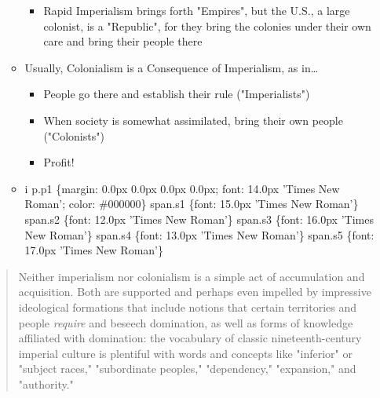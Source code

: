 \documentclass[letterpaper]{article}
\begin{document}
\begin{itemize}
\begin{itemize}
\begin{itemize}
\item Rapid Imperialism brings forth "Empires", but the U.S., a large
colonist, is a "Republic", for they bring the colonies under their
own care and bring their people there
\end{itemize}

\item Usually, Colonialism is a Consequence of Imperialism, as in\ldots{}

\begin{itemize}
\item People go there and establish their rule ("Imperialists")
\item When society is somewhat assimilated, bring their own people
("Colonists")
\item Profit!
\end{itemize}

\item i p.p1 \{margin: 0.0px 0.0px 0.0px 0.0px; font: 14.0px 'Times New
Roman'; color: \#000000\} span.s1 \{font: 15.0px 'Times New Roman'\}
span.s2 \{font: 12.0px 'Times New Roman'\} span.s3 \{font: 16.0px
'Times New Roman'\} span.s4 \{font: 13.0px 'Times New Roman'\} span.s5
\{font: 17.0px 'Times New Roman'\}
\end{itemize}
\end{itemize}

\begin{quote}
Neither imperialism nor colonialism is a simple act of accumulation
and acquisition. Both are supported and perhaps even impelled by
impressive ideological formations that include notions that certain
territories and people \emph{require} and beseech domination, as well as
forms of knowledge affiliated with domination: the vocabulary of
classic nineteenth-century imperial culture is plentiful with words
and concepts like "inferior" or "subject races," "subordinate
peoples," "dependency," "expansion," and "authority."
\end{quote}
\end{document}
